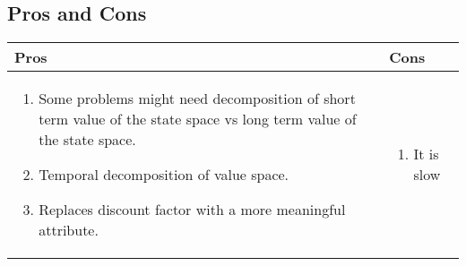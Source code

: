 \subsection{Pros and Cons}
\begin{tabular}{p{}p{}}
  \toprule
  Pros & Cons \\
  \midrule
\begin{enumerate}
  \item Some problems might need decomposition of short term value of the state space vs long term value of the state space.
  \item Temporal decomposition of value space.
  \item Replaces discount factor with a more meaningful attribute.
\end{enumerate}
 & 
\begin{enumerate}
  \item It is slow
\end{enumerate}

\\ \bottomrule
\end{tabular}
